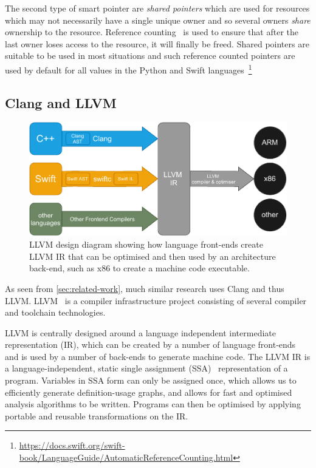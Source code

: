 \documentclass{mpaper}
\begin{document}
    The second type of smart pointer are \emph{shared pointers} which are used for resources which may not necessarily have a single unique owner and so several owners \emph{share} ownership to the resource.
    Reference counting~\cite{Collins1960} is used to ensure that after the last owner loses access to the resource, it will finally be freed.
    Shared pointers are suitable to be used in most situations and such reference counted pointers are used by default for all values in the Python and Swift languages~\footnote{\url{https://docs.swift.org/swift-book/LanguageGuide/AutomaticReferenceCounting.html}}
    
    \subsection{Clang and LLVM}\label{subsec:clang-and-llvm}
    
    \begin{figure}
        \centering
        \includegraphics[scale=0.75]{images/llvm.pdf}
        \caption{LLVM design diagram showing how language front-ends create LLVM IR that can be optimised and then used by an architecture back-end, such as x86 to create a machine code executable.}
        \label{fig:llvm-design}
    \end{figure}  
    
    As seen from \autoref{sec:related-work}, much similar research uses Clang and thus LLVM.
    LLVM~\cite{Lattner2004} is a compiler infrastructure project consisting of several compiler and toolchain technologies. 
    
    LLVM is centrally designed around a language independent intermediate representation (IR), which can be created by a number of language front-ends and is used by a number of back-ends to generate machine code. 
    The LLVM IR is a language-independent, static single assignment (SSA)~\cite{Rosen1988} representation of a program.
    Variables in SSA form can only be assigned once, which allows us to efficiently generate definition-usage graphs, and allows for fast and optimised analysis algorithms to be written.
    Programs can then be optimised by applying portable and reusable transformations on the IR.
    
\end{document}
